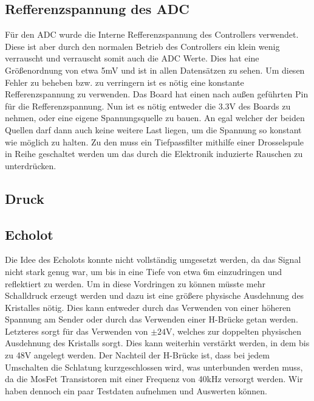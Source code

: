 \documentclass[12pt,a4paper,titlepage,headinclude,bibtotoc]{scrartcl}
\begin{document}
\subsection{Refferenzspannung des ADC}
Für den ADC wurde die Interne Refferenzspannung des Controllers verwendet.
Diese ist aber durch den normalen Betrieb des Controllers ein klein wenig verrauscht und verrauscht somit auch die ADC Werte.
Dies hat eine Größenordnung von etwa 5\si{\milli\volt} und ist in allen Datensätzen zu sehen.
Um diesen Fehler zu beheben bzw. zu verringern ist es nötig eine konstante Refferenzspannung zu verwenden.
Das Board hat einen nach außen geführten Pin für die Refferenzspannung.
Nun ist es nötig entweder die 3.3\si{\volt} des Boards zu nehmen, oder eine eigene Spannungsquelle zu bauen.
An egal welcher der beiden Quellen darf dann auch keine weitere Last liegen, um die Spannung so konstant wie möglich zu halten.
Zu den muss ein Tiefpassfilter mithilfe einer Drosselspule in Reihe geschaltet werden um das durch die Elektronik induzierte Rauschen zu unterdrücken.

\subsection{Druck}


\subsection{Echolot}
Die Idee des Echolots konnte nicht vollständig umgesetzt werden, da das Signal nicht stark genug war, um bis in eine Tiefe von etwa 6\si{\meter} einzudringen und reflektiert zu werden.
Um in diese Vordringen zu können müsste mehr Schalldruck erzeugt werden und dazu ist eine größere physische Ausdehnung des Kristalles nötig.
Dies kann entweder durch das Verwenden von einer höheren Spannung am Sender oder durch das Verwenden einer H-Brücke getan werden.
Letzteres sorgt für das Verwenden von $\pm24\si{\volt}$, welches zur doppelten physischen Ausdehnung des Kristalls sorgt.
Dies kann weiterhin verstärkt werden, in dem bis zu 48\si{\volt} angelegt werden.
Der Nachteil der H-Brücke ist, dass bei jedem Umschalten die Schlatung kurzgeschlossen wird, was unterbunden werden muss, da die MosFet Transistoren mit einer Frequenz von 40\si{\kilo\hertz} versorgt werden.
Wir haben dennoch ein paar Testdaten aufnehmen und Auswerten können.
\end{document}

